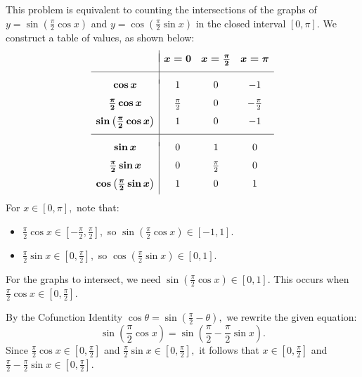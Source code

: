 \begin{enumerate}
This problem is equivalent to counting the intersections of the graphs of $y=\sin\left(\frac{\pi}{2}\cos x\right)$ and $y=\cos\left(\frac{\pi}{2}\sin x\right)$ in the closed interval $[0,\pi].$ We construct a table of values, as shown below:
 \[\begin{array}{c|ccc} & & & \\ [-2ex] & \boldsymbol{x=0} & \boldsymbol{x=\frac{\pi}{2}} & \boldsymbol{x=\pi} \\ [1.5ex] \hline & & & \\ [-1ex] \boldsymbol{\cos x} & 1 & 0 & -1 \\ [1.5ex] \boldsymbol{\frac{\pi}{2}\cos x} & \frac{\pi}{2} & 0 & -\frac{\pi}{2} \\ [1.5ex] \boldsymbol{\sin\left(\frac{\pi}{2}\cos x\right)} & 1 & 0 & -1 \\ [1.5ex] \hline  & & & \\ [-1ex] \boldsymbol{\sin x} & 0 & 1 & 0 \\ [1.5ex] \boldsymbol{\frac{\pi}{2}\sin x} & 0 & \frac{\pi}{2} & 0 \\ [1.5ex] \boldsymbol{\cos\left(\frac{\pi}{2}\sin x\right)} & 1 & 0 & 1 \\ [1ex] \end{array}\]For $x\in[0,\pi],$ note that:

 
            \begin{itemize}
        \item $\frac{\pi}{2}\cos x\in\left[-\frac{\pi}{2},\frac{\pi}{2}\right],$ so $\sin\left(\frac{\pi}{2}\cos x\right)\in[-1,1].$
            \end{itemize}
            
            \begin{itemize}
        \item $\frac{\pi}{2}\sin x\in\left[0,\frac{\pi}{2}\right],$ so $\cos\left(\frac{\pi}{2}\sin x\right)\in[0,1].$
            \end{itemize}
            For the graphs to intersect, we need $\sin\left(\frac{\pi}{2}\cos x\right)\in[0,1].$ This occurs when $\frac{\pi}{2}\cos x\in\left[0,\frac{\pi}{2}\right].$

 By the Cofunction Identity $\cos\theta=\sin\left(\frac{\pi}{2}-\theta\right),$ we rewrite the given equation:
 \[\sin\left(\frac{\pi}{2}\cos x\right) = \sin\left(\frac{\pi}{2}-\frac{\pi}{2}\sin x\right).\]Since $\frac{\pi}{2}\cos x\in\left[0,\frac{\pi}{2}\right]$ and $\frac{\pi}{2}\sin x\in\left[0,\frac{\pi}{2}\right],$ it follows that $x\in\left[0,\frac{\pi}{2}\right]$ and $\frac{\pi}{2}-\frac{\pi}{2}\sin x\in\left[0,\frac{\pi}{2}\right].$


\end{enumerate}
